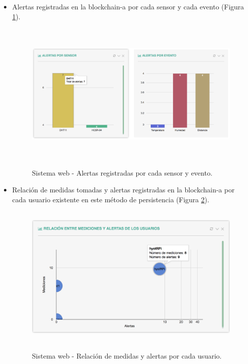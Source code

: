 \documentclass[12pt,a4paper, twoside]{report}
\begin{document}
\begin{itemize}
		\item Alertas registradas en la \gls{blockchain-a} por cada sensor y  cada evento (Figura \ref{fig:web_alertsbySensorEvent}).
		 
		 \begin{figure}[!ht]   
			\caption{Sistema web - Alertas registradas por cada sensor y evento.} 
			\begin{center}
		 		\includegraphics[width=15cm, height=7cm]{Images/userGuide/web/alertsbySensorEvent} \\
				\label{fig:web_alertsbySensorEvent} 
			\end{center}  	
		\end{figure}
		
		\item Relación de medidas tomadas y alertas registradas en la \gls{blockchain-a} por cada usuario existente en este método de persistencia (Figura \ref{fig:web_alertsMeasurements}).
		 
		 \begin{figure}[!ht]   
			\caption{Sistema web - Relación de medidas y alertas por cada usuario.} 
			\begin{center}
		 		\includegraphics[width=16cm, height=7cm]{Images/userGuide/web/alertsMeasurements} \\
				\label{fig:web_alertsMeasurements} 
			\end{center}  	
		\end{figure}		
		 

\end{itemize}
\end{document}
